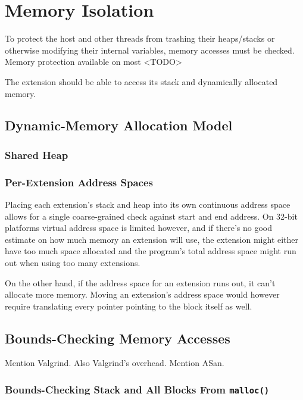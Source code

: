 \chapter {Memory Isolation}

To protect the host and other threads from trashing their heaps/stacks or
otherwise modifying their internal variables, memory accesses must be checked.
Memory protection available on most <TODO>

The extension should be able to access its stack and dynamically allocated
memory.

\section {Dynamic-Memory Allocation Model}

\subsection {Shared Heap}

\subsection {Per-Extension Address Spaces}

Placing each extension's stack and heap into its own continuous address space
allows for a single coarse-grained check against start and end address. On
32-bit platforms virtual address space is limited however, and if there's no
good estimate on how much memory an extension will use, the extension might
either have too much space allocated and the program's total address space
might run out when using too many extensions.

On the other hand, if the address space for an extension runs out, it can't
allocate more memory. Moving an extension's address space would however require
translating every pointer pointing to the block itself as well.

\section {Bounds-Checking Memory Accesses}

Mention Valgrind. Also Valgrind's overhead. Mention ASan.

\subsection {Bounds-Checking Stack and All Blocks From \texttt{malloc()} }

